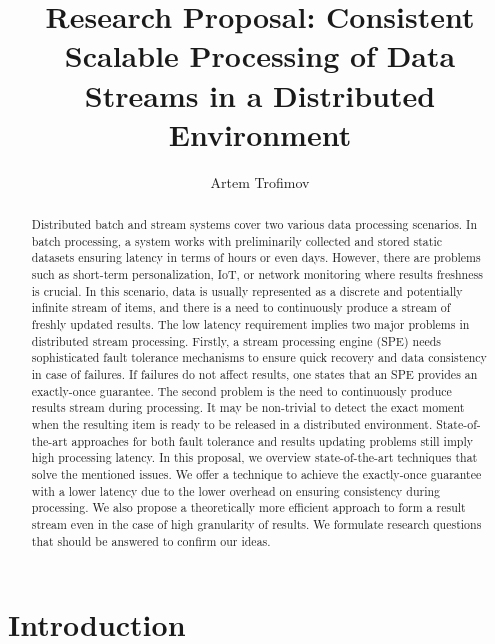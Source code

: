 \documentclass[runningheads]{llncs}
\begin{document}
\title {Research Proposal: Consistent Scalable Processing of Data Streams in  a Distributed Environment
}
\author{Artem Trofimov}

\maketitle

\begin{abstract}
Distributed batch and stream systems cover two various data processing scenarios. In batch processing, a system works with preliminarily collected and stored static datasets ensuring latency in terms of hours or even days. However, there are problems such as short-term personalization, IoT, or network monitoring where results freshness is crucial. In this scenario, data is usually represented as a discrete and potentially infinite stream of items, and there is a need to continuously produce a stream of freshly updated results. 
The low latency requirement implies two major problems in distributed stream processing. Firstly, a stream processing engine (SPE) needs sophisticated fault tolerance mechanisms to ensure quick recovery and data consistency in case of failures. 
If failures do not affect results, one states that an SPE provides an exactly-once guarantee. 
The second problem is the need to continuously produce results stream during processing. It may be non-trivial to detect the exact moment when the resulting item is ready to be released in a distributed environment. State-of-the-art approaches for both fault tolerance and results updating problems still imply high processing latency. 
In this proposal, we overview state-of-the-art techniques that solve the mentioned issues. We offer a technique to achieve the exactly-once guarantee with a lower latency due to the lower overhead on ensuring consistency during processing. We also propose a theoretically more efficient approach to form a result stream even in the case of high granularity of results. We formulate research questions that should be answered to confirm our ideas. 
\end{abstract}

\section {Introduction}
\end{document}
